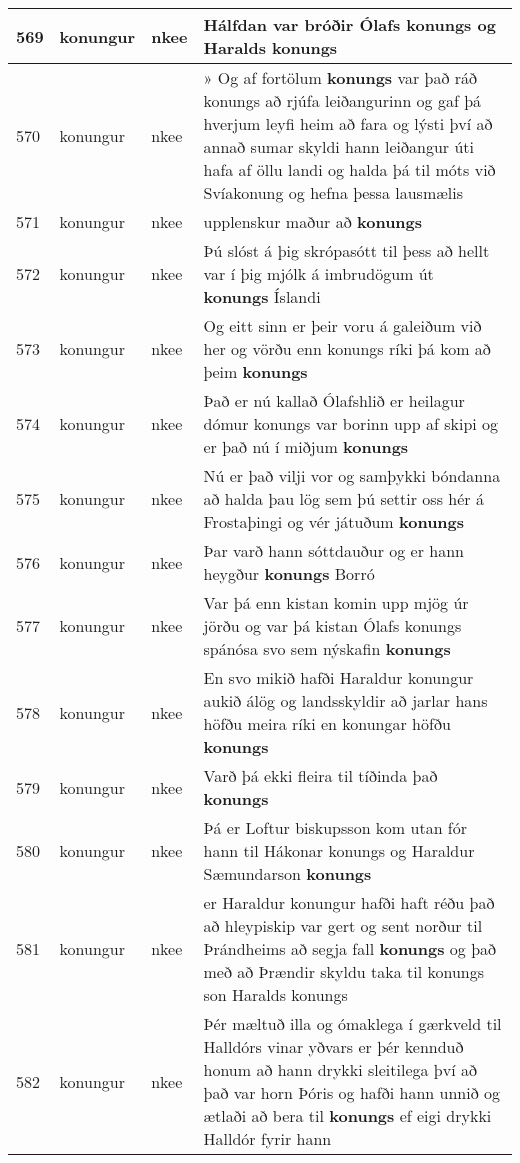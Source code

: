 \documentclass{article}
\begin{document}
\begin{longtable}{p{1cm}|p{1cm}|p{1cm}|p{13cm}}
\hline
569&konungur&nkee&Hálfdan var bróðir Ólafs \textbf{konungs} og Haralds konungs\\
\hline
570&konungur&nkee&» Og af fortölum \textbf{konungs} var það ráð konungs að rjúfa leiðangurinn og gaf þá hverjum leyfi heim að fara og lýsti því að annað sumar skyldi hann leiðangur úti hafa af öllu landi og halda þá til móts við Svíakonung og hefna þessa lausmælis\\
\hline
571&konungur&nkee&upplenskur maður að \textbf{konungs} \\
\hline
572&konungur&nkee&Þú slóst á þig skrópasótt til þess að hellt var í þig mjólk á imbrudögum út \textbf{konungs} Íslandi\\
\hline
573&konungur&nkee&Og eitt sinn er þeir voru á galeiðum við her og vörðu enn konungs ríki þá kom að þeim \textbf{konungs} \\
\hline
574&konungur&nkee&Það er nú kallað Ólafshlið er heilagur dómur konungs var borinn upp af skipi og er það nú í miðjum \textbf{konungs} \\
\hline
575&konungur&nkee&Nú er það vilji vor og samþykki bóndanna að halda þau lög sem þú settir oss hér á Frostaþingi og vér játuðum \textbf{konungs} \\
\hline
576&konungur&nkee&Þar varð hann sóttdauður og er hann heygður \textbf{konungs} Borró\\
\hline
577&konungur&nkee&Var þá enn kistan komin upp mjög úr jörðu og var þá kistan Ólafs konungs spánósa svo sem nýskafin \textbf{konungs} \\
\hline
578&konungur&nkee&En svo mikið hafði Haraldur konungur aukið álög og landsskyldir að jarlar hans höfðu meira ríki en konungar höfðu \textbf{konungs} \\
\hline
579&konungur&nkee&Varð þá ekki fleira til tíðinda það \textbf{konungs} \\
\hline
580&konungur&nkee&Þá er Loftur biskupsson kom utan fór hann til Hákonar konungs og Haraldur Sæmundarson \textbf{konungs} \\
\hline
581&konungur&nkee&er Haraldur konungur hafði haft réðu það að hleypiskip var gert og sent norður til Þrándheims að segja fall \textbf{konungs} og það með að Þrændir skyldu taka til konungs son Haralds konungs\\
\hline
582&konungur&nkee&Þér mæltuð illa og ómaklega í gærkveld til Halldórs vinar yðvars er þér kennduð honum að hann drykki sleitilega því að það var horn Þóris og hafði hann unnið og ætlaði að bera til \textbf{konungs} ef eigi drykki Halldór fyrir hann\\

\end{longtable}
\end{document}
